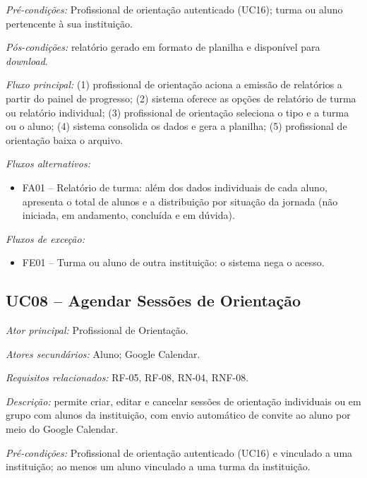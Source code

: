 \textit{Pré-condições:} Profissional de orientação autenticado (UC16); turma ou aluno pertencente à sua instituição.

\textit{Pós-condições:} relatório gerado em formato de planilha e disponível para \textit{download}.

\textit{Fluxo principal:} (1) profissional de orientação aciona a emissão de relatórios a partir do painel de progresso; (2) sistema oferece as opções de relatório de turma ou relatório individual; (3) profissional de orientação seleciona o tipo e a turma ou o aluno; (4) sistema consolida os dados e gera a planilha; (5) profissional de orientação baixa o arquivo.

\textit{Fluxos alternativos:}

\begin{itemize}[label={},leftmargin=\parindent,itemsep=0pt,topsep=0pt]
  \item FA01 – Relatório de turma: além dos dados individuais de cada aluno, apresenta o total de alunos e a distribuição por situação da jornada (não iniciada, em andamento, concluída e em dúvida).
\end{itemize}

\textit{Fluxos de exceção:}

\begin{itemize}[label={},leftmargin=\parindent,itemsep=0pt,topsep=0pt]
  \item FE01 – Turma ou aluno de outra instituição: o sistema nega o acesso.
\end{itemize}

\subsection*{UC08 -- Agendar Sessões de Orientação}\label{uc:uc08}

\textit{Ator principal:} Profissional de Orientação.

\textit{Atores secundários:} Aluno; Google Calendar.

\textit{Requisitos relacionados:} RF-05, RF-08, RN-04, RNF-08.

\textit{Descrição:} permite criar, editar e cancelar sessões de orientação individuais ou em grupo com alunos da instituição, com envio automático de convite ao aluno por meio do Google Calendar.

\textit{Pré-condições:} Profissional de orientação autenticado (UC16) e vinculado a uma instituição; ao menos um aluno vinculado a uma turma da instituição.


